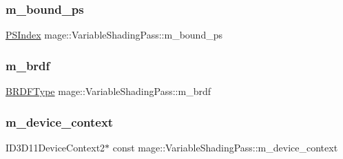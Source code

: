 \subsubsection{\texorpdfstring{m\+\_\+bound\+\_\+ps}{m\_bound\_ps}}
{\footnotesize\ttfamily \hyperlink{classmage_1_1_variable_shading_pass_a49519e421ac5be93136d9efdbf075d4a}{P\+S\+Index} mage\+::\+Variable\+Shading\+Pass\+::m\+\_\+bound\+\_\+ps\hspace{0.3cm}{\ttfamily [private]}}

\hypertarget{classmage_1_1_variable_shading_pass_ac6147f2068fd7727fe2d78584ff68767}{}\label{classmage_1_1_variable_shading_pass_ac6147f2068fd7727fe2d78584ff68767} 
\subsubsection{\texorpdfstring{m\+\_\+brdf}{m\_brdf}}
{\footnotesize\ttfamily \hyperlink{namespacemage_ae7a7a03a7b34d7e2689689bb8295cd38}{B\+R\+D\+F\+Type} mage\+::\+Variable\+Shading\+Pass\+::m\+\_\+brdf\hspace{0.3cm}{\ttfamily [private]}}

\hypertarget{classmage_1_1_variable_shading_pass_afff786ea38b64ba069866fdd6b525ba7}{}\label{classmage_1_1_variable_shading_pass_afff786ea38b64ba069866fdd6b525ba7} 
\subsubsection{\texorpdfstring{m\+\_\+device\+\_\+context}{m\_device\_context}}
{\footnotesize\ttfamily I\+D3\+D11\+Device\+Context2$\ast$ const mage\+::\+Variable\+Shading\+Pass\+::m\+\_\+device\+\_\+context\hspace{0.3cm}{\ttfamily [private]}}

\hypertarget{classmage_1_1_variable_shading_pass_ab69a4cb0b85f857a705887299efd17c7}{}\label{classmage_1_1_variable_shading_pass_ab69a4cb0b85f857a705887299efd17c7} 

